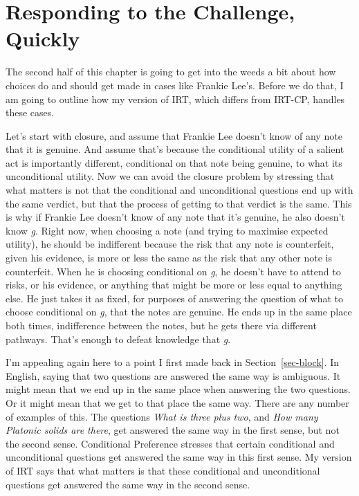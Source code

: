 \documentclass[
  12pt,
  letterpaper,
]{scrbook}
\begin{document}
\section{Responding to the Challenge, Quickly}\label{sec-tiesresponse}

The second half of this chapter is going to get into the weeds a bit
about how choices do and should get made in cases like Frankie Lee's.
Before we do that, I am going to outline how my version of IRT, which
differs from IRT-CP, handles these cases.

Let's start with closure, and assume that Frankie Lee doesn't know of
any note that it is genuine. And assume that's because the conditional
utility of a salient act is importantly different, conditional on that
note being genuine, to what its unconditional utility. Now we can avoid
the closure problem by stressing that what matters is not that the
conditional and unconditional questions end up with the same verdict,
but that the process of getting to that verdict is the same. This is why
if Frankie Lee doesn't know of any note that it's genuine, he also
doesn't know \emph{g}. Right now, when choosing a note (and trying to
maximise expected utility), he should be indifferent because the risk
that any note is counterfeit, given his evidence, is more or less the
same as the risk that any other note is counterfeit. When he is choosing
conditional on \emph{g}, he doesn't have to attend to risks, or his
evidence, or anything that might be more or less equal to anything else.
He just takes it as fixed, for purposes of answering the question of
what to choose conditional on \emph{g}, that the notes are genuine. He
ends up in the same place both times, indifference between the notes,
but he gets there via different pathways. That's enough to defeat
knowledge that \emph{g}.

I'm appealing again here to a point I first made back in
Section~\ref{sec-block}. In English, saying that two questions are
answered the same way is ambiguous. It might mean that we end up in the
same place when answering the two questions. Or it might mean that we
get to that place the same way. There are any number of examples of
this. The questions \emph{What is three plus two}, and \emph{How many
Platonic solids are there}, get answered the same way in the first
sense, but not the second sense. Conditional Preference stresses that
certain conditional and unconditional questions get answered the same
way in this first sense. My version of IRT says that what matters is
that these conditional and unconditional questions get answered the same
way in the second sense.
\end{document}
